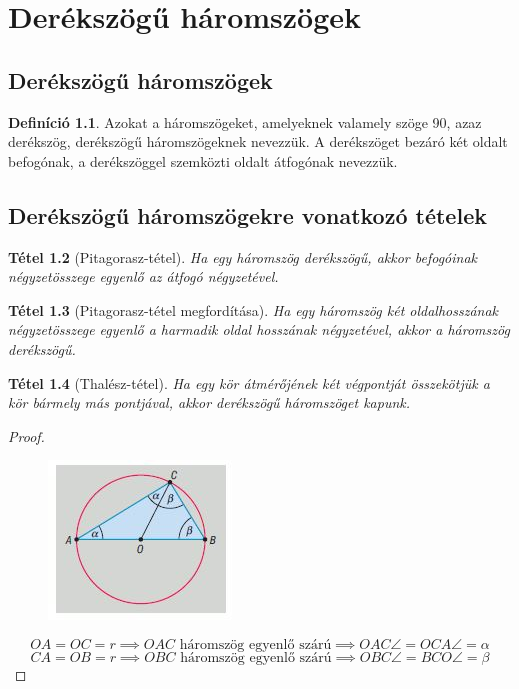 \documentclass[twoside,12pt]{report}
\newtheorem{theorem}{Tétel}[section]
\theoremstyle{definition}
\newtheorem{definition}[theorem]{Definíció}
\begin{document}
\chapter{Derékszögű háromszögek}
\section{Derékszögű háromszögek}
	\begin{definition}
		Azokat a háromszögeket, amelyeknek valamely szöge 90\degree, azaz derékszög, derékszögű
		háromszögeknek nevezzük. A derékszöget bezáró két oldalt befogónak, a derékszöggel szemközti oldalt átfogónak nevezzük.
	\end{definition}
\section{Derékszögű háromszögekre vonatkozó tételek}
	\begin{theorem}[Pitagorasz-tétel]
		Ha egy háromszög derékszögű, akkor befogóinak négyzetösszege egyenlő az átfogó négyzetével.
	\end{theorem}
	\begin{theorem}[Pitagorasz-tétel megfordítása]
		Ha egy háromszög két oldalhosszának négyzetösszege egyenlő a harmadik oldal hosszának négyzetével, akkor a háromszög derékszögű.
	\end{theorem}
	\begin{theorem}[Thalész-tétel]
		Ha egy kör átmérőjének két végpontját összekötjük a kör bármely más pontjával, akkor derékszögű háromszöget kapunk.
	\end{theorem}
	\begin{proof}
		\begin{figure}[H]
			\centering
			\includegraphics[width=0.4\linewidth]{Thalész.JPG}
			\caption{}
			\label{fig:thalesz}
		\end{figure}
		\begin{equation*}
			OA=OC=r\implies OAC \text{ háromszög egyenlő szárú} \implies OAC\angle=OCA\angle=\alpha
		\end{equation*}
		\begin{equation*}
		CA=OB=r\implies OBC \text{ háromszög egyenlő szárú}\implies OBC\angle=BCO\angle=\beta
		\end{equation*}
	\end{proof}
\end{document}
